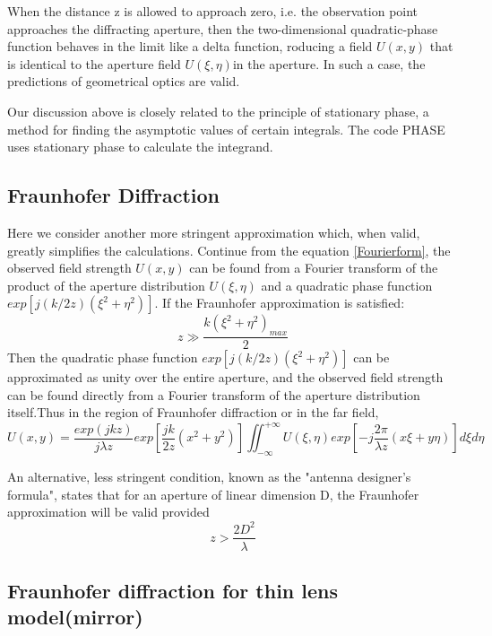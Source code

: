 \documentclass[../main.tex]{subfiles}
\begin{document}
	When the distance z is allowed to approach zero,  i.e. the observation point approaches the diffracting aperture, then the two-dimensional quadratic-phase function behaves in the limit like a delta function,  roducing a field $U(x,y)$ that is identical to the aperture field $U(\xi,\eta)$in the aperture. In such a case, the predictions of geometrical optics are valid.

	Our discussion above is closely related to the principle of stationary phase, a method for finding the asymptotic values of certain integrals. The code PHASE uses stationary phase to calculate the integrand.
	\subsection{Fraunhofer Diffraction}
	Here we consider another more stringent approximation which, when valid, greatly simplifies the calculations. Continue from the equation \ref{Fourierform}, the observed field strength $U(x,y)$ can be found from a Fourier transform of the product of the aperture distribution $U(\xi,\eta)$ and a quadratic phase function $exp[j(k/2z)(\xi^2+\eta^2)]$. If the Fraunhofer approximation is satisfied:
	\begin{equation}
	z\gg \frac{k(\xi^2+\eta^2)_{max}}{2}
	\end{equation}
	Then the quadratic phase function $exp[j(k/2z)(\xi^2+\eta^2)]$ can be approximated as unity over the entire aperture, and the observed field strength can be found directly from a Fourier transform of the aperture distribution itself.Thus in the region of Fraunhofer diffraction or in the far field,
	\begin{equation}
	U(x,y)=\frac{exp(jkz)}{j\lambda z}exp\left[\frac{jk}{2z}(x^2+y^2)\right]\iint_{-\infty}^{+\infty} U(\xi,\eta)exp\left[-j\frac{2\pi}{\lambda z}(x\xi+y\eta)\right]d\xi d\eta\label{Fraunhofer}
	\end{equation}

	An alternative, less stringent condition, known as the "antenna designer's formula", states that for an aperture of linear dimension D, the Fraunhofer approximation will be valid provided
	\begin{equation}
	z>\frac{2D^2}{\lambda}
	\end{equation}

	\subsection{Fraunhofer diffraction for thin lens model(mirror)}
\end{document}
